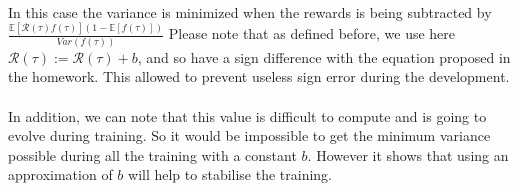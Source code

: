 \paragraph{}
In this case the variance is minimized when the rewards is being subtracted by $\frac{\mathds{E} \left[ \mathcal{R}(\tau) f(\tau) \right] ( 1 - \mathds{E} \left[ f(\tau) \right])}{Var(f(\tau))}$
Please note that as defined before, we use here $\mathcal{R}(\tau) := \mathcal{R}(\tau) + b$, and so have a sign difference with the equation proposed in the homework.
This allowed to prevent useless sign error during the development.

\paragraph{}
In addition, we can note that this value is difficult to compute and is going to evolve during training.
So it would be impossible to get the minimum variance possible during all the training with a constant $b$.
However it shows that using an approximation of $b$ will help to stabilise the training.
